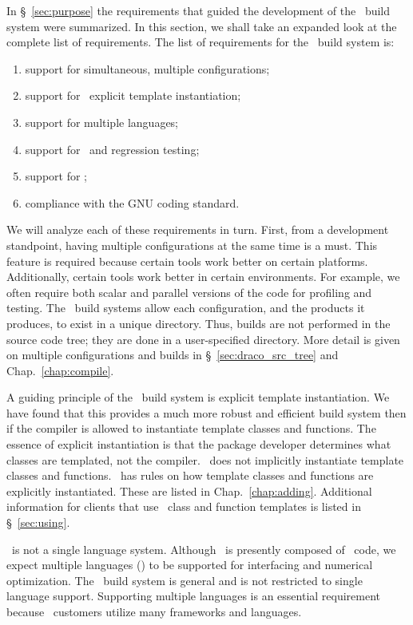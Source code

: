 In \S~\ref{sec:purpose} the requirements that guided the development
of the \draco\ build system were summarized.  In this section, we
shall take an expanded look at the complete list of requirements.  The
list of requirements for the \draco\ build system is:
\begin{enumerate}
\item support for simultaneous, multiple configurations;
\item support for \cpp\ explicit template instantiation;
\item support for multiple languages;
\item support for \dejagnu\ and regression testing;
\item support for \purify;
\item compliance with the GNU coding standard.
\end{enumerate}
We will analyze each of these requirements in turn.  First, from a
development standpoint, having multiple configurations at the same
time is a must.  This feature is required because certain tools work
better on certain platforms.  Additionally, certain tools work better
in certain environments.  For example, we often require both scalar
and parallel versions of the code for profiling and testing.  The
\draco\ build systems allow each configuration, and the products it
produces, to exist in a unique directory.  Thus, builds are not
performed in the source code tree; they are done in a user-specified
directory.  More detail is given on multiple configurations and builds 
in \S~\ref{sec:draco_src_tree} and Chap.~\ref{chap:compile}.

A guiding principle of the \draco\ build system is explicit template
instantiation.  We have found that this provides a much more robust
and efficient build system then if the compiler is allowed to
instantiate template classes and functions.  The essence of explicit
instantiation is that the package developer determines what classes
are templated, not the compiler.  \draco\ does not implicitly
instantiate template classes and functions.  \draco\ has rules on how
template classes and functions are explicitly instantiated.  These are
listed in Chap.~\ref{chap:adding}.  Additional information for clients
that use \draco\ class and function templates is listed in
\S~\ref{sec:using}.

\draco\ is not a single language system.  Although \draco\ is
presently composed of \cpp\ code, we expect multiple languages
(\fortran) to be supported for interfacing and numerical
optimization.  The \draco\ build system is general and is not
restricted to single language support.  Supporting multiple languages
is an essential requirement because \draco\ customers utilize many
frameworks and languages.

